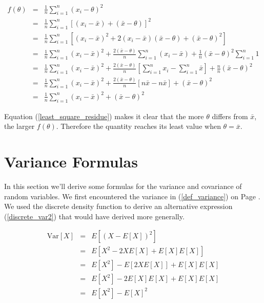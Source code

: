 \documentclass[]{article}
\begin{document}
\begin{eqnarray}
f(\theta) &= &\frac{1}{n} \sum_{i=1}^n (x_i - \theta)^2 \nonumber \\
  &= &\frac{1}{n} \sum_{i=1}^n \left[ (x_i - \bar{x}) + (\bar{x} - \theta)\right]^2 \nonumber \\
  &= &\frac{1}{n} \sum_{i=1}^n \left[ (x_i - \bar{x})^2 + 2 (x_i-\bar{x})(\bar{x} - \theta) + (\bar{x} - \theta)^2 \right] \nonumber \\
  &= &\frac{1}{n} \sum_{i=1}^n (x_i - \bar{x})^2 + 
     \frac{2(\bar{x} - \theta)}{n} \sum_{i=1}^n (x_i - \bar{x}) +
     \frac{1}{n} (\bar{x} - \theta)^2 \sum_{i=1}^n 1 \nonumber \\
  &= &\frac{1}{n} \sum_{i=1}^n (x_i - \bar{x})^2 + 
     \frac{2(\bar{x} - \theta)}{n} \left[ \sum_{i=1}^n x_i - \sum_{i=1}^n  \bar{x} \right]  +
     \frac{n}{n} (\bar{x} - \theta)^2 \nonumber \\
  &= &\frac{1}{n} \sum_{i=1}^n (x_i - \bar{x})^2 + 
     \frac{2(\bar{x} - \theta)}{n} \left[ n \bar{x} - n \bar{x} \right]  +
     (\bar{x} - \theta)^2 \nonumber \\
  &= &\frac{1}{n} \sum_{i=1}^n (x_i - \bar{x})^2 + 
     (\bar{x} - \theta)^2 \label{least_square_residue}
\end{eqnarray}

Equation (\ref{least_square_residue}) makes it clear that
the more $\theta$ differs from $\bar{x}$, the larger $f(\theta)$.
Therefore the quantity reaches its least value
when $\theta = \bar{x}$.


\section{Variance Formulas}

In this section we'll derive some formulas for the variance
and covariance of random variables.  We first encountered the
variance in (\ref{def_variance}) on Page \pageref{def_variance}.
We used the discrete density function to derive an alternative
expression (\ref{discrete_var2}) that would have derived more
generally.

\begin{eqnarray*}
\mbox{Var}[X] &= &E\left[(X - E[X])^2 \right] \\
   &= & E \left[ X^2 - 2XE[X] + E[X] E[X] \right] \\
   &= & E[X^2] - E\left[2XE[X]\right] + E[X] E[X] \\
   &= & E[X^2] - 2 E[X] E[X] + E[X] E[X] \\
   &= & E[X^2] - E[X]^2
\end{eqnarray*}
\end{document}
